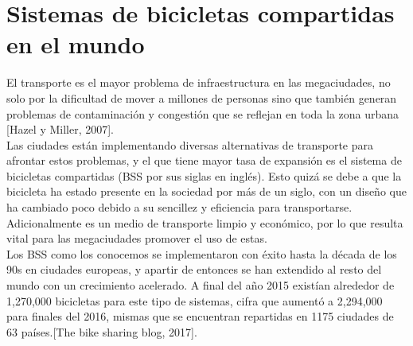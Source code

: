 \documentclass[12pt,spanish]{article}
\begin{document}
	\section{Sistemas de bicicletas compartidas en el mundo}
 	El transporte es el mayor problema de infraestructura en las megaciudades, no solo por la dificultad de mover a millones de personas sino que también generan problemas de contaminación y congestión que se reflejan en toda la zona urbana [Hazel y Miller, 2007].\\
 	Las ciudades están implementando diversas alternativas de transporte para afrontar estos problemas, y el que tiene mayor tasa de expansión es el sistema de bicicletas compartidas (BSS por sus siglas en inglés). Esto quizá se debe a que la bicicleta ha estado presente en la sociedad por más de un siglo, con un diseño que ha cambiado poco debido a su sencillez y eficiencia para transportarse. Adicionalmente es un medio de transporte limpio y económico, por lo que resulta vital para las megaciudades promover el uso de estas.\\
 	Los BSS como los conocemos se implementaron con éxito hasta la década de los 90s en ciudades europeas, y apartir de entonces se han extendido al resto del mundo con un crecimiento acelerado. A final del año 2015 existían alrededor de 1,270,000 bicicletas para este tipo de sistemas, cifra que aumentó a 2,294,000 para finales del 2016, mismas que se encuentran repartidas en 1175 ciudades de 63 países.[The bike sharing blog, 2017].\\\\
\end{document}
